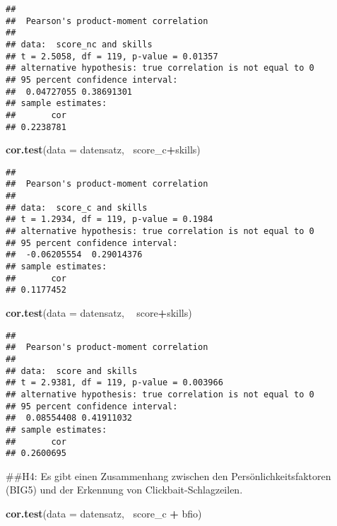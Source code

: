\documentclass[]{article}
\newenvironment{Shaded}{\begin{snugshade}}{\end{snugshade}}
\newcommand{\KeywordTok}[1]{\textcolor[rgb]{0.13,0.29,0.53}{\textbf{#1}}}
\newcommand{\DataTypeTok}[1]{\textcolor[rgb]{0.13,0.29,0.53}{#1}}
\newcommand{\StringTok}[1]{\textcolor[rgb]{0.31,0.60,0.02}{#1}}
\newcommand{\OperatorTok}[1]{\textcolor[rgb]{0.81,0.36,0.00}{\textbf{#1}}}
\newcommand{\NormalTok}[1]{#1}
\begin{document}
\begin{verbatim}
## 
##  Pearson's product-moment correlation
## 
## data:  score_nc and skills
## t = 2.5058, df = 119, p-value = 0.01357
## alternative hypothesis: true correlation is not equal to 0
## 95 percent confidence interval:
##  0.04727055 0.38691301
## sample estimates:
##       cor 
## 0.2238781
\end{verbatim}

\begin{Shaded}
\begin{Highlighting}[]
\KeywordTok{cor.test}\NormalTok{(}\DataTypeTok{data =}\NormalTok{ datensatz, }\OperatorTok{~}\NormalTok{score_c}\OperatorTok{+}\NormalTok{skills)}
\end{Highlighting}
\end{Shaded}

\begin{verbatim}
## 
##  Pearson's product-moment correlation
## 
## data:  score_c and skills
## t = 1.2934, df = 119, p-value = 0.1984
## alternative hypothesis: true correlation is not equal to 0
## 95 percent confidence interval:
##  -0.06205554  0.29014376
## sample estimates:
##       cor 
## 0.1177452
\end{verbatim}

\begin{Shaded}
\begin{Highlighting}[]
\KeywordTok{cor.test}\NormalTok{(}\DataTypeTok{data =}\NormalTok{ datensatz, }\OperatorTok{~}\StringTok{ }\NormalTok{score}\OperatorTok{+}\NormalTok{skills)}
\end{Highlighting}
\end{Shaded}

\begin{verbatim}
## 
##  Pearson's product-moment correlation
## 
## data:  score and skills
## t = 2.9381, df = 119, p-value = 0.003966
## alternative hypothesis: true correlation is not equal to 0
## 95 percent confidence interval:
##  0.08554408 0.41911032
## sample estimates:
##       cor 
## 0.2600695
\end{verbatim}

\begin{Shaded}
\begin{Highlighting}[]
\NormalTok{##H4: Es gibt einen Zusammenhang zwischen den Persönlichkeitsfaktoren (BIG5) und der Erkennung von Clickbait-Schlagzeilen. }

\KeywordTok{cor.test}\NormalTok{(}\DataTypeTok{data =}\NormalTok{ datensatz, }\OperatorTok{~}\NormalTok{score_c }\OperatorTok{+}\StringTok{ }\NormalTok{bfio)}
\end{Highlighting}
\end{Shaded}
\end{document}

